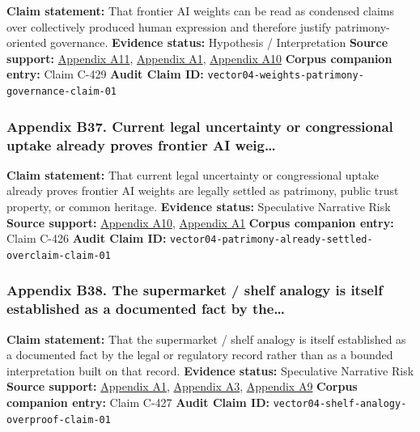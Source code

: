 \documentclass[
  american,
  11pt,
  letterpaper,
]{article}
\begin{document}
\textbf{Claim statement:} That frontier AI weights can be read as
condensed claims over collectively produced human expression and
therefore justify patrimony-oriented governance. \textbf{Evidence
status:} Hypothesis / Interpretation \textbf{Source support:}
\hyperref[ch-04-appendix-a11-ai-copyright-weights-a-new-frontier-in-intellectual-property-law]{Appendix
A11},
\hyperref[ch-04-appendix-a1-copyright-and-artificial-intelligence-part-3-generative-ai-training-pre-publication-version]{Appendix
A1},
\hyperref[ch-04-appendix-a10-bipartisan-house-task-force-report-on-artificial-intelligence]{Appendix
A10} \textbf{Corpus companion entry:} Claim C-429 \textbf{Audit Claim
ID:} \texttt{vector04-weights-patrimony-governance-claim-01}

\subsubsection{Appendix B37. Current legal uncertainty or congressional
uptake already proves frontier AI
weig\ldots{}}\label{ch-04-appendix-b37-current-legal-uncertainty-or-congressional-uptake-already-proves-frontier-ai-weig}

\textbf{Claim statement:} That current legal uncertainty or
congressional uptake already proves frontier AI weights are legally
settled as patrimony, public trust property, or common heritage.
\textbf{Evidence status:} Speculative Narrative Risk \textbf{Source
support:}
\hyperref[ch-04-appendix-a10-bipartisan-house-task-force-report-on-artificial-intelligence]{Appendix
A10},
\hyperref[ch-04-appendix-a1-copyright-and-artificial-intelligence-part-3-generative-ai-training-pre-publication-version]{Appendix
A1} \textbf{Corpus companion entry:} Claim C-426 \textbf{Audit Claim
ID:} \texttt{vector04-patrimony-already-settled-overclaim-claim-01}

\subsubsection{Appendix B38. The supermarket / shelf analogy is itself
established as a documented fact by
the\ldots{}}\label{ch-04-appendix-b38-the-supermarket-shelf-analogy-is-itself-established-as-a-documented-fact-by-the}

\textbf{Claim statement:} That the supermarket / shelf analogy is itself
established as a documented fact by the legal or regulatory record
rather than as a bounded interpretation built on that record.
\textbf{Evidence status:} Speculative Narrative Risk \textbf{Source
support:}
\hyperref[ch-04-appendix-a1-copyright-and-artificial-intelligence-part-3-generative-ai-training-pre-publication-version]{Appendix
A1},
\hyperref[ch-04-appendix-a3-reddit-strikes-60m-deal-allowing-google-to-train-ai-models-on-its-posts-unveils-ipo-plans]{Appendix
A3},
\hyperref[ch-04-appendix-a9-the-problem-with-annotation-human-labour-and-outsourcing-between-france-and-madagascar]{Appendix
A9} \textbf{Corpus companion entry:} Claim C-427 \textbf{Audit Claim
ID:} \texttt{vector04-shelf-analogy-overproof-claim-01}
\end{document}
